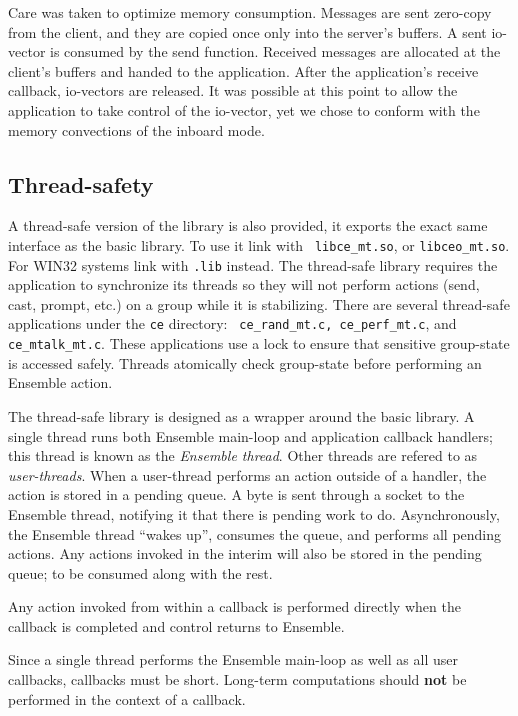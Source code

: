 Care was taken to optimize memory consumption. Messages are sent
zero-copy from the client, and they are copied once only into the
server's buffers. A sent io-vector is consumed by the send
function. Received messages are allocated at the client's buffers and
handed to the application. After the application's receive callback,
io-vectors are released. It was possible at this point to allow the
application to take control of the io-vector, yet we chose to conform
with the memory convections of the inboard mode. 

\subsection{Thread-safety}
A thread-safe version of the library is also provided, it exports the
exact same interface as the basic library. To use it link with {\tt
libce\_mt.so}, or {\tt libceo\_mt.so}.  For WIN32 systems link with
{\tt .lib} instead. The thread-safe library requires the application
to synchronize its threads so they will not perform actions (send,
cast, prompt, etc.) on a group while it is stabilizing. There are
several thread-safe applications under the {\tt ce} directory: {\tt
ce\_rand\_mt.c, ce\_perf\_mt.c}, and {\tt ce\_mtalk\_mt.c}. These applications
use a lock to ensure that sensitive group-state is accessed safely.
Threads atomically check group-state before performing an Ensemble
action.

The thread-safe library is designed as a wrapper around the basic
library. A single thread runs both Ensemble main-loop and application
callback handlers; this thread is known as the {\it Ensemble
thread}. Other threads are refered to as {\it user-threads}. When a
user-thread performs an action outside of a handler, the action is
stored in a pending queue. A byte is sent through a socket to the
Ensemble thread, notifying it that there is pending work to do. 
Asynchronously, the Ensemble thread ``wakes up'', consumes the queue,
and performs all pending actions. Any actions invoked in the interim
will also be stored in the pending queue; to be consumed along with
the rest.

Any action invoked from within a callback is performed directly when
the callback is completed and control returns to Ensemble. 

Since a single thread performs the Ensemble main-loop as well as all user
callbacks, callbacks must be short. Long-term computations should {\bf
not} be performed in the context of a callback.

